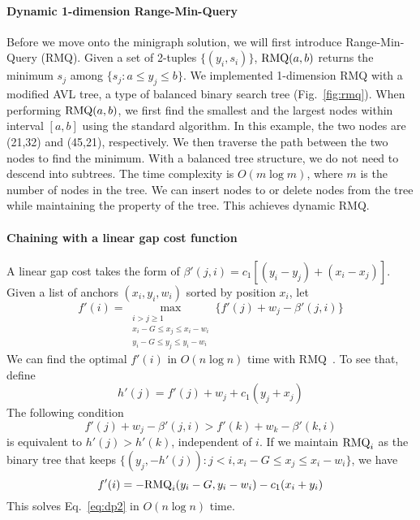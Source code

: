 \documentclass[twocolumn]{bmcart}%
\begin{document}
\paragraph*{Dynamic 1-dimension Range-Min-Query}
Before we move onto the minigraph solution, we will first introduce
Range-Min-Query (RMQ). Given a set of 2-tuples $\{(y_i,s_i)\}$, ${\rm
RMQ}(a,b)$ returns the minimum $s_j$ among $\{s_j:a\le y_j\le b\}$.
We implemented 1-dimension RMQ with a modified AVL tree, a type of balanced
binary search tree (Fig.~\ref{fig:rmq}). When performing ${\rm RMQ}(a,b)$, 
we first find the smallest and the largest nodes within interval $[a,b]$ using
the standard algorithm. In this example, the two nodes are (21,32) and (45,21),
respectively. We then traverse the path between the two nodes to find the
minimum. With a balanced tree structure, we do not need to descend into
subtrees. The time complexity is $O(m\log m)$, where $m$ is the number of nodes
in the tree. We can insert nodes to or delete nodes from the tree while
maintaining the property of the tree. This achieves dynamic RMQ.

\paragraph*{Chaining with a linear gap cost function}
A linear gap cost takes the form of
$\beta'(j,i)=c_1[(y_i-y_j)+(x_i-x_j)]$. Given a list of anchors
$(x_i,y_i,w_i)$ sorted by position $x_i$, let
\begin{equation}\label{eq:dp2}
f'(i)=\max_{\substack{\text{$i>j\ge1$}\\ \text{$x_i-G\le x_j\le x_i-w_i$}\\ \text{$y_i-G\le y_j\le y_i-w_i$}}}\big\{f'(j)+w_j-\beta'(j,i)\big\}
\end{equation}
We can find the optimal $f'(i)$ in $O(n\log n)$ time with
RMQ~\cite{DBLP:conf/wabi/AbouelhodaO03,Otto:2011aa}. To see that, define
$$h'(j)=f'(j)+w_j+c_1(y_j+x_j)$$
The following condition
$$f'(j)+w_j-\beta'(j,i)>f'(k)+w_k-\beta'(k,i)$$
is equivalent to $h'(j)>h'(k)$, independent of $i$. If we maintain ${\rm
RMQ}_i$ as the binary tree that keeps $\{(y_j,-h'(j)):j<i,x_i-G\le x_j\le x_i-w_i\}$, we have
$$
f'(i)=-{\rm RMQ}_i(y_i-G,y_i-w_i)-c_1(x_i+y_i)
$$
This solves Eq.~\ref{eq:dp2} in $O(n\log n)$ time.
\end{document}
